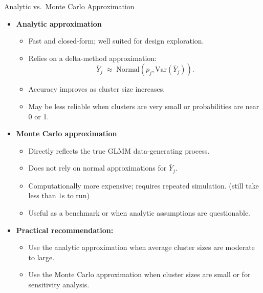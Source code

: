 \documentclass[aspectratio=169]{beamer} %
\begin{document}
\begin{frame}{Analytic vs.\ Monte Carlo Approximation}

\begin{itemize}
  \item \textbf{Analytic approximation}
    \begin{itemize}
      \item Fast and closed-form; well suited for design exploration.
      \item Relies on a delta-method approximation:
        \[
          \bar Y_j \;\approx\; \text{Normal}(p_j, \mathrm{Var}(\bar Y_j)).
        \]
      \item Accuracy improves as cluster size increases.
      \item May be less reliable when clusters are very small or probabilities
            are near 0 or 1.
    \end{itemize}

  \medskip

  \item \textbf{Monte Carlo approximation}
    \begin{itemize}
      \item Directly reflects the true GLMM data-generating process.
      \item Does not rely on normal approximations for $\bar Y_j$.
      \item Computationally more expensive; requires repeated simulation. (still take less than $1$s to run)
      \item Useful as a benchmark or when analytic assumptions are questionable.
    \end{itemize}

  \medskip

  \item \textbf{Practical recommendation:}
    \begin{itemize}
      \item Use the analytic approximation when average cluster sizes are moderate
            to large.
      \item Use the Monte Carlo approximation when cluster sizes are small
            or for sensitivity analysis.
    \end{itemize}
\end{itemize}

\end{frame}
\end{document}
